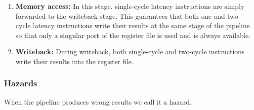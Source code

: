 \begin{enumerate}
\begin{itemize}
        These operations have a two-cycle latency.
      \item \textbf{Multi cycle instructions:} Includes dividing and multiplying integers and all floating-point operations.
        These types of operations feed their arguments to the multi-cycle multiply- and divde units.
        The remainder of the pipeline can continue working while the multiply/divide blocks are busy.
        In order to keep the writeback stage simple, these blocks write their results to a seperate set of registers.
    \end{itemize}
  \item \textbf{Memory access:} In this stage, single-cycle latency instructions are simply forwarded to the writeback stage.
    This guarantees that both one and two cycle latency instructions write their results at the same stage of the pipeline so that only a singular port of the register file is used and is always available.
  \item \textbf{Writeback:} During writeback, both single-cycle and two-cycle instructions write their results into the register file.
\end{enumerate}

\subsubsection{Hazards}

When the pipeline produces wrong results we call it a hazard.

